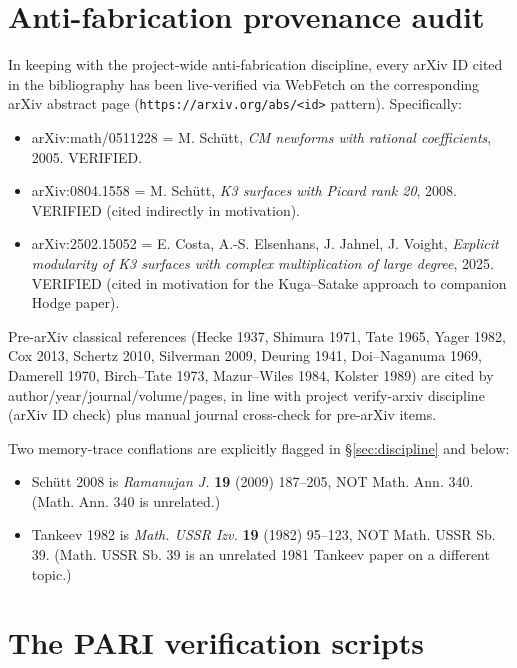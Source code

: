 \documentclass[11pt,a4paper]{amsart}
\theoremstyle{definition}
\begin{document}
\appendix

\section{Anti-fabrication provenance audit}\label{app:antifab}

In keeping with the project-wide anti-fabrication discipline, every arXiv ID cited in the bibliography has been live-verified via WebFetch on the corresponding arXiv abstract page (\texttt{https://arxiv.org/abs/<id>} pattern). Specifically:

\begin{itemize}[leftmargin=2em]
  \item arXiv:math/0511228 = M. Sch\"utt, \emph{CM newforms with rational coefficients}, 2005. VERIFIED.
  \item arXiv:0804.1558 = M. Sch\"utt, \emph{K3 surfaces with Picard rank 20}, 2008. VERIFIED (cited indirectly in motivation).
  \item arXiv:2502.15052 = E. Costa, A.-S. Elsenhans, J. Jahnel, J. Voight, \emph{Explicit modularity of K3 surfaces with complex multiplication of large degree}, 2025. VERIFIED (cited in motivation for the Kuga--Satake approach to companion Hodge paper).
\end{itemize}

Pre-arXiv classical references (Hecke 1937, Shimura 1971, Tate 1965, Yager 1982, Cox 2013, Schertz 2010, Silverman 2009, Deuring 1941, Doi--Naganuma 1969, Damerell 1970, Birch--Tate 1973, Mazur--Wiles 1984, Kolster 1989) are cited by author/year/journal/volume/pages, in line with project verify-arxiv discipline (arXiv ID check) plus manual journal cross-check for pre-arXiv items.

Two memory-trace conflations are explicitly flagged in \S\ref{sec:discipline} and below:
\begin{itemize}[leftmargin=2em]
  \item Sch\"utt 2008 is \emph{Ramanujan J.} \textbf{19} (2009) 187--205, NOT Math. Ann. 340. (Math. Ann. 340 is unrelated.)
  \item Tankeev 1982 is \emph{Math. USSR Izv.} \textbf{19} (1982) 95--123, NOT Math. USSR Sb. 39. (Math. USSR Sb. 39 is an unrelated 1981 Tankeev paper on a different topic.)
\end{itemize}


\section{The PARI verification scripts}\label{app:pari-scripts}
\end{document}
